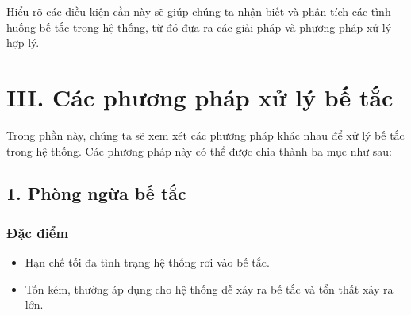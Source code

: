 \documentclass[12pt]{report}
\begin{document}
Hiểu rõ các điều kiện cần này sẽ giúp chúng ta nhận biết và phân tích các tình huống bế tắc trong hệ thống, từ đó đưa ra các giải pháp và phương pháp xử lý hợp lý.

\section*{III. Các phương pháp xử lý bế tắc}
Trong phần này, chúng ta sẽ xem xét các phương pháp khác nhau để xử lý bế tắc trong hệ thống. Các phương pháp này có thể được chia thành ba mục như sau:

\subsection*{1. Phòng ngừa bế tắc}
\subsubsection*{Đặc điểm}
\begin{itemize}
	\item Hạn chế tối đa tình trạng hệ thống rơi vào bế tắc.
	\item Tốn kém, thường áp dụng cho hệ thống dễ xảy ra bế tắc và tổn thất xảy ra lớn.
\end{itemize}
\end{document}
